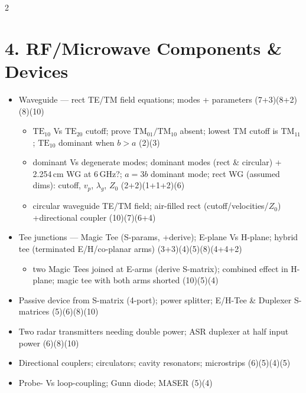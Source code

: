 \documentclass[10pt]{article}
\begin{document}
\begin{multicols}{2}
\section*{4. RF/Microwave Components \& Devices}
\begin{itemize}
  \item Waveguide --- rect TE/TM field equations; modes + parameters \hfill (7+3)(8+2)(8)(10)
    \begin{itemize}
      \item $\text{TE}_{10}$ Vs $\text{TE}_{20}$ cutoff; prove $\text{TM}_{01}/\text{TM}_{10}$ absent; lowest TM cutoff is $\text{TM}_{11}$; $\text{TE}_{10}$ dominant when $b{>}a$ \hfill (2)(3)
      \item dominant Vs degenerate modes; dominant modes (rect \& circular) + 2.254\,cm WG at 6\,GHz?; $a{=}3b$ dominant mode; rect WG (assumed dims): cutoff, $v_p$, $\lambda_g$, $Z_0$ \hfill (2+2)(1+1+2)(6)
      \item circular waveguide TE/TM field; air-filled rect (cutoff/velocities/$Z_0$) +directional coupler \hfill (10)(7)(6+4)
    \end{itemize}
  \item Tee junctions --- Magic Tee (S-params, +derive); E-plane Vs H-plane; hybrid tee (terminated E/H/co-planar arms) \hfill (3+3)(4)(5)(8)(4+4+2)
    \begin{itemize}
      \item two Magic Tees joined at E-arms (derive S-matrix); combined effect in H-plane; magic tee with both arms shorted \hfill (10)(5)(4)
    \end{itemize}
  \item Passive device from S-matrix (4-port); power splitter; E/H-Tee \& Duplexer S-matrices \hfill (5)(6)(8)(10)
  \item Two radar transmitters needing double power; ASR duplexer at half input power \hfill (6)(8)(10)
  \item Directional couplers; circulators; cavity resonators; microstrips \hfill (6)(5)(4)(5)
  \item Probe- Vs loop-coupling; Gunn diode; MASER \hfill (5)(4)
\end{itemize}


\end{multicols}
\end{document}

